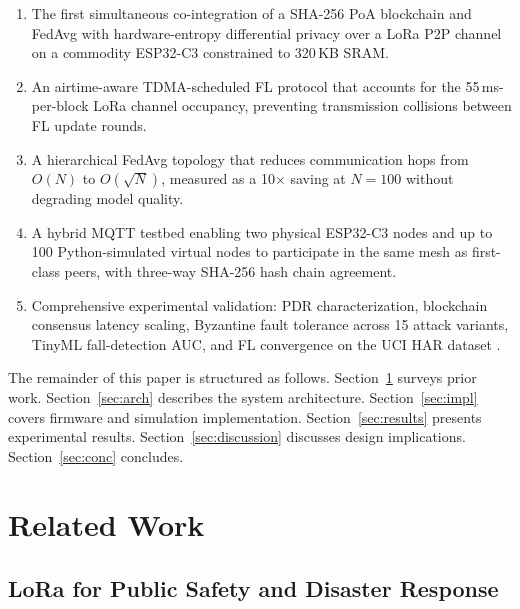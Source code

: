 \documentclass[journal]{IEEEtran}
\begin{document}
\begin{enumerate}
\item The first simultaneous co-integration of a SHA-256 PoA blockchain
      and FedAvg with hardware-entropy differential privacy over a LoRa
      P2P channel on a commodity ESP32-C3 constrained to 320\,KB SRAM.

\item An airtime-aware TDMA-scheduled FL protocol that accounts for the
      55\,ms-per-block LoRa channel occupancy, preventing transmission
      collisions between FL update rounds.

\item A hierarchical FedAvg topology that reduces communication hops from
      $O(N)$ to $O(\sqrt{N})$, measured as a 10$\times$ saving at
      $N{=}100$ without degrading model quality.

\item A hybrid MQTT testbed enabling two physical ESP32-C3 nodes and up to
      100 Python-simulated virtual nodes to participate in the same mesh
      as first-class peers, with three-way SHA-256 hash chain agreement.

\item Comprehensive experimental validation: PDR characterization,
      blockchain consensus latency scaling, Byzantine fault tolerance
      across 15 attack variants, TinyML fall-detection AUC, and FL
      convergence on the UCI HAR dataset \cite{Anguita2013}.
\end{enumerate}

The remainder of this paper is structured as follows.
Section~\ref{sec:related} surveys prior work.
Section~\ref{sec:arch} describes the system architecture.
Section~\ref{sec:impl} covers firmware and simulation implementation.
Section~\ref{sec:results} presents experimental results.
Section~\ref{sec:discussion} discusses design implications.
Section~\ref{sec:conc} concludes.

\section{Related Work}
\label{sec:related}

\subsection{LoRa for Public Safety and Disaster Response}
\end{document}
